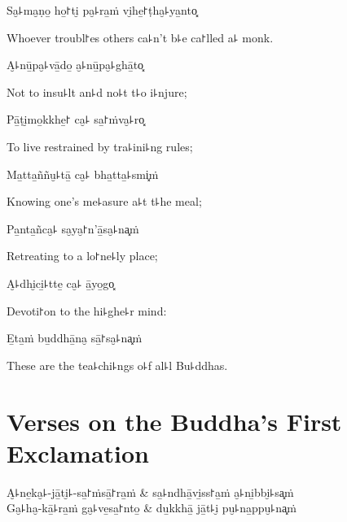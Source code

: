 Sa̮꜕ma̮ṇo̱ ho̱꜓ti̮ pa̮꜕ra̱ṁ vi̮he̱꜓ṭha̮꜕ya̱nto͓

\begin{english}
  Whoever troubl꜓es others ca꜕n't b꜕e ca꜓lled a꜕ monk.
\end{english}

\clearpage

A̮꜕nū̱pa̮꜕vā̱do̱ a̮꜕nū̱pa̮꜕ghā̱to͓

\begin{english}
  Not to insu꜕lt an꜕d no꜕t t꜕o i꜕njure;
\end{english}

Pā̱ṭi̮mo̱kkhe̱꜓ ca̮꜕ sa̱꜓ṁva̮꜕ro͓

\begin{english}
  To live restrained by tra꜕ini꜕ng rules;
\end{english}

Ma̱tta̱ññu̮꜕tā̱ ca̮꜕ bha̱tta̱꜕smi͓ṁ

\begin{english}
  Knowing one's me꜕asure a꜕t t꜕he meal;
\end{english}

Pa̱nta̱ñca̮꜕ sa̮ya̮꜓n'ā̱sa̮꜕na͓ṁ

\begin{english}
  Retreating to a lo꜓ne꜕ly place;
\end{english}

A̮꜕dhi̮ci̱꜕tte̱ ca̮꜕ ā̱yo̱go͓

\begin{english}
  Devoti꜓on to the hi꜕ghe꜕r mind:
\end{english}

E̱ta̱ṁ bu̱ddhā̱na̮ sā̱꜓sa̮꜕na͓ṁ

\begin{english}
  These are the tea꜕chi꜕ngs o꜕f al꜕l Bu꜕ddhas.
\end{english}

\chapter{Verses on the Buddha's First Exclamation}


\begin{leader}
\end{leader}

\begin{twochants}
  A̮꜕ne̱ka̮꜕-jā̱ti̮꜕-sa̱꜓ṁsā̱꜓ra̱ṁ & sa̱꜕ndhā̱vi̱ss꜓a̱ṁ a̮꜕ni̱bbi̮꜕sa͓ṁ \\
  Ga̮꜕ha̮-kā̱꜕ra̱ṁ ga̮꜕ve̱sa̱꜓nto̱ & du̱kkhā̱ jā̱t꜕i̮ pu̮꜕na̱ppu̮꜕na͓ṁ \\
\end{twochants}

